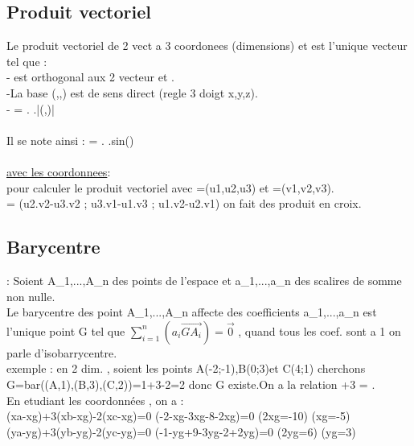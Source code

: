 \documentclass[a4paper,8pt,openany]{book}
\begin{document}
\subsection{Produit vectoriel}
Le produit vectoriel de 2 vect a 3 coordonees (dimensions)  et  est l'unique vecteur  tel que :\\
- est orthogonal aux 2 vecteur  et .\\
-La base (,,) est de sens direct (regle 3 doigt x,y,z).\\
-\lVert {} \rVert = \lVert {} \rVert.\lVert {} \rVert.|\sin(,)| \\
\\
Il se note ainsi : \lVert {} \wedge {} \rVert = \lVert {} \rVert.\lVert {} \rVert.sin() \\
\\
\underline{avec les coordonnees}:\\
pour calculer le produit vectoriel avec =(u1,u2,u3) et =(v1,v2,v3).\\
\lVert {} \wedge {} \rVert = (u2.v2-u3.v2 ; u3.v1-u1.v3 ; u1.v2-u2.v1) on fait des produit en croix.\\



\subsection{Barycentre}: Soient A_1,...,A_n des points de l'espace et a_1,...,a_n des scalires de somme non nulle.\\
Le barycentre des point A_1,...,A_n affecte des coefficients  a_1,...,a_n est l'unique point G tel que $\sum_{i=1}^{n}(a_i\vec{GA_i})=\vec{0}$ , quand tous les coef. sont a 1 on parle d'isobarrycentre.\\
exemple : en 2 dim. , soient les points A(-2;-1),B(0;3)et C(4;1) cherchons G=bar((A,1),(B,3),(C,2))=1+3-2=2  donc G existe.On a la relation  \lVert {} \rVert+3 \lVert {}  \lVert {} \rVert= .\\
En etudiant les coordonnées , on a : \\
(xa-xg)+3(xb-xg)-2(xc-xg)=0 \Leftrightarrow (-2-xg-3xg-8-2xg)=0 \Leftrightarrow (2xg=-10) \Leftrightarrow (xg=-5)\\
(ya-yg)+3(yb-yg)-2(yc-yg)=0 \Leftrightarrow (-1-yg+9-3yg-2+2yg)=0 \Leftrightarrow (2yg=6) \Leftrightarrow (yg=3)\\
\\
\end{document}
